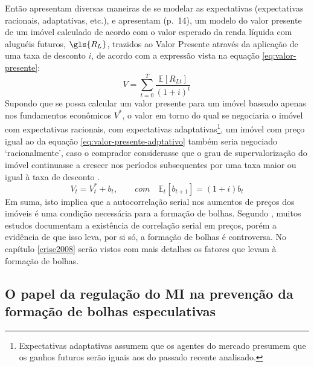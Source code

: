 \documentclass[
	12pt,				%
	oneside,			%
	a4paper,			%
	chapter=TITLE,		%
	section=TITLE,		%
	english,			%
	brazil				%
	]{abntex2}
\begin{document}
Então \textcite[p.~12]{Malpezzi2002TheRO} apresentam diversas maneiras de se modelar as
expectativas (expectativas racionais, adaptativas, etc.), e apresentam (p.~14),
um modelo do valor presente de um imóvel calculado de acordo com o valor
esperado da renda líquida com aluguéis futuros, \(\gls{R_L}\), trazidos ao Valor
Presente através da aplicação de uma taxa de desconto \(i\), de acordo com a
expressão vista na equação \eqref{eq:valor-presente}:
\begin{equation}
V = \sum_{t = 0}^T \frac{\mathbb{E}[R_{Lt}]}{(1+i)^t}
\label{eq:valor-presente}
\end{equation}
Supondo que se possa calcular um valor presente para um imóvel baseado apenas
nos fundamentos econômicos \(V^*\), o valor em torno do qual se negociaria o
imóvel com expectativas racionais, com expectativas adaptativas\footnote{Expectativas adaptativas assumem que os agentes do mercado presumem que os
  ganhos futuros serão iguais aos do passado recente analisado.}, um imóvel
com preço igual ao da equação \eqref{eq:valor-presente-adptativo} também seria
negociado `racionalmente', caso o comprador considerasse que o grau de
supervalorização do imóvel continuasse a crescer nos períodos subsequentes por
uma taxa maior ou igual à taxa de desconto \autocite[15]{Malpezzi2002TheRO}.
\begin{equation}
V_t = V_t^* + b_t, \qquad com \quad \mathbb{E}_t[b_{t+1}] = (1+i)b_t
\label{eq:valor-presente-adptativo}
\end{equation}
Em suma, isto implica que a autocorrelação serial nos aumentos de preços dos
imóveis é uma condição necessária para a formação de bolhas. Segundo
\textcite[p.~15]{Malpezzi2002TheRO}, muitos estudos documentam a existência de correlação
serial em preços, porém a evidência de que isso leva, por si só, a formação de
bolhas é controversa. No capítulo \ref{crise2008} serão vistos com mais detalhes os
fatores que levam à formação de bolhas.

\hypertarget{o-papel-da-regulauxe7uxe3o-do-na-prevenuxe7uxe3o-da-formauxe7uxe3o-de-bolhas-especulativas}{%
\subsection{\texorpdfstring{O papel da regulação do \gls{MI} na prevenção da formação de bolhas especulativas}{O papel da regulação do  na prevenção da formação de bolhas especulativas}}\label{o-papel-da-regulauxe7uxe3o-do-na-prevenuxe7uxe3o-da-formauxe7uxe3o-de-bolhas-especulativas}}
\end{document}
